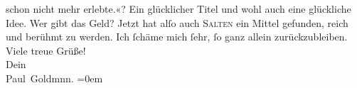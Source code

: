 \begin{ledgroupsized}[t]{13cm}
{{{                  schon nicht mehr erlebte.}}}\label{K_L03067-2h}«? Ein glücklicher Titel und wohl auch eine
               glückliche Idee. Wer gibt das Geld? Jetzt hat alſo auch \textsc{Salten} ein Mittel gefunden, reich und berühmt zu werden. Ich ſchäme mich ſehr, ſo ganz
               allein zurückzubleiben.\pend
           \pstart
           Viele treue Grüße! {\\[\baselineskip]}Dein {\\[\baselineskip]}\spacefill\mbox{Paul Goldmnn.}\pend
           \leftskip=0em{}
         
         \endnumbering{}\end{ledgroupsized}  \newcommand{\dateiname}{L03067}\newcommand{\titel}{Paul Goldmann an Arthur Schnitzler, 16. 5. [1901]}\newcommand{\editorInnen}{Martin Anton Müller und Laura Untner}
      